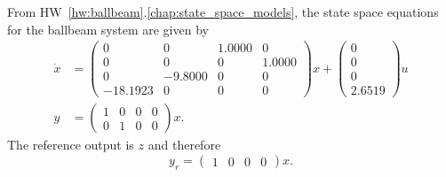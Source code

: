 From HW~\ref{hw:ballbeam}.\ref{chap:state_space_models}, the state space equations for the ballbeam system are given by
\begin{align*}
\dot{x} &= \begin{pmatrix}
         0 &        0 &   1.0000 &        0 \\
         0 &        0 &        0 &   1.0000 \\
         0 &  -9.8000 &        0 &        0 \\
  -18.1923 &        0 &        0 &        0
\end{pmatrix} x + \begin{pmatrix}
         0 \\
         0 \\
         0 \\
         2.6519
\end{pmatrix} u \\
y &= \begin{pmatrix}
1 & 0 & 0 & 0 \\
0 & 1 & 0 & 0 
\end{pmatrix} x.
\end{align*}
The reference output is $z$ and therefore
\[
y_r = \begin{pmatrix} 1 & 0 & 0 & 0 \end{pmatrix}x.
\]

